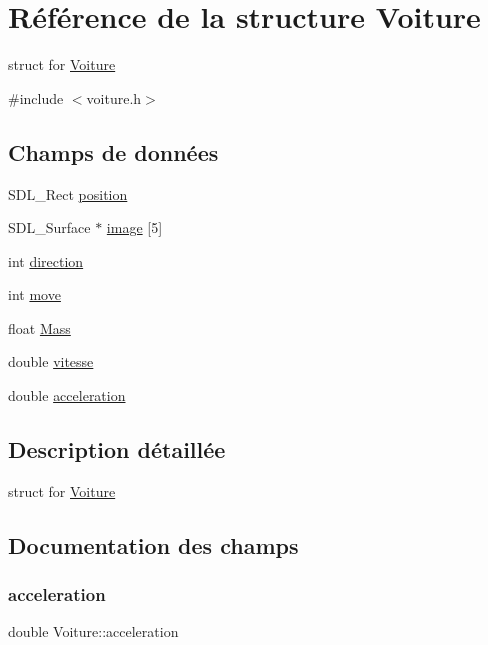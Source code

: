 \hypertarget{structVoiture}{}\section{Référence de la structure Voiture}
\label{structVoiture}


struct for \hyperlink{structVoiture}{Voiture}  




{\ttfamily \#include $<$voiture.\+h$>$}

\subsection*{Champs de données}
\begin{DoxyCompactItemize}
\item 
S\+D\+L\+\_\+\+Rect \hyperlink{structVoiture_a68748b5ea1dfc3d0d2797f675e03f139}{position}
\item 
S\+D\+L\+\_\+\+Surface $\ast$ \hyperlink{structVoiture_aeeb926bfdf6133f6c0e4e7c6c1a09394}{image} \mbox{[}5\mbox{]}
\item 
int \hyperlink{structVoiture_a9bb35d6796c9a008309a574e14984227}{direction}
\item 
int \hyperlink{structVoiture_a71f00083102cac3802ca4fc5686c9b28}{move}
\item 
float \hyperlink{structVoiture_a017e4fa03a51b03bbf72232bf33fa2f7}{Mass}
\item 
double \hyperlink{structVoiture_ad4b4d14b11ebddd488eda893e3438bb3}{vitesse}
\item 
double \hyperlink{structVoiture_a9774aa8f724f65d16b7d0104e1ed8ecd}{acceleration}
\end{DoxyCompactItemize}


\subsection{Description détaillée}
struct for \hyperlink{structVoiture}{Voiture} 

\subsection{Documentation des champs}
\mbox{\label{structVoiture_a9774aa8f724f65d16b7d0104e1ed8ecd}} 
\subsubsection{\texorpdfstring{acceleration}{acceleration}}
{\footnotesize\ttfamily double Voiture\+::acceleration}

